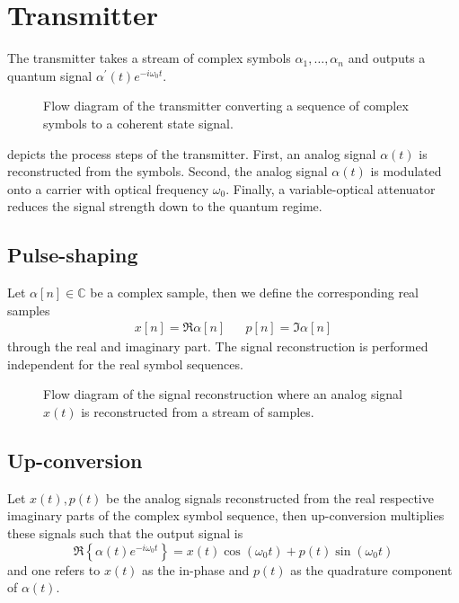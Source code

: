 \section{Transmitter}

The transmitter takes a stream of complex symbols $\alpha_1,\dots,\alpha_n$ and outputs a quantum signal $\alpha^\prime(t)e^{-i\omega_0t}$.

\begin{figure}[htb]
	\centering
	
	\caption{Flow diagram of the transmitter converting a sequence of complex symbols to a coherent state signal.}\label{fig:transmitter}
\end{figure}
 depicts the process steps of the transmitter.
First, an analog signal $\alpha(t)$ is reconstructed from the symbols.
Second, the analog signal $\alpha(t)$ is modulated onto a carrier with optical frequency $\omega_0$.
Finally, a variable-optical attenuator reduces the signal strength down to the quantum regime.

\subsection{Pulse-shaping}

Let $\alpha[n]\in\mathbb{C}$ be a complex sample, then we define the corresponding real samples
\begin{align}
	x[n]=\Re{\alpha[n]}
	&&
	p[n]=\Im{\alpha[n]}
\end{align}
through the real and imaginary part.
The signal reconstruction is performed independent for the real symbol sequences.
\begin{figure}[htb]
	\centering
	
	\caption{Flow diagram of the signal reconstruction where an analog signal $x(t)$ is reconstructed from a stream of samples.}\label{fig:transmitter}
\end{figure}


\subsection{Up-conversion}

Let $x(t),p(t)$ be the analog signals reconstructed from the real respective imaginary parts of the complex symbol sequence, then up-conversion multiplies these signals such that the output signal is~\cite[p.~25]{Madhow2008}
\begin{equation}
	\Re\left\{
		\alpha(t)
		e^{-i\omega_0t}
	\right\}
	=
	x(t)
	\cos(\omega_0t)
	+
	p(t)
	\sin(\omega_0t)
\end{equation}
and one refers to $x(t)$ as the in-phase and $p(t)$ as the quadrature component of $\alpha(t)$.

